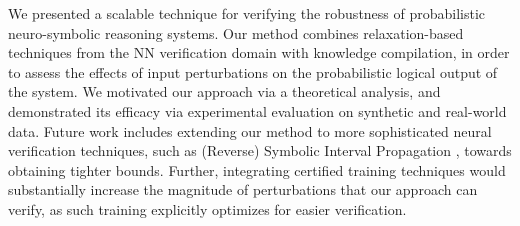 We presented a scalable technique for verifying the robustness of probabilistic neuro-symbolic reasoning systems. Our method combines relaxation-based techniques from the NN verification domain with knowledge compilation, in order to assess the effects of input perturbations on the probabilistic logical output of the system. We motivated our approach via a theoretical analysis, and demonstrated its efficacy via experimental evaluation on synthetic and real-world data. Future work includes extending our method to more sophisticated neural verification techniques, such as (Reverse) Symbolic Interval Propagation \cite{gehr2018ai2,wang2021beta}, towards obtaining tighter bounds. Further, integrating certified training techniques \cite{smallBoxesMuller2023,expressiveLossesDePalma2024} would substantially increase the magnitude of perturbations that our approach can verify, as such training explicitly optimizes for easier verification.



